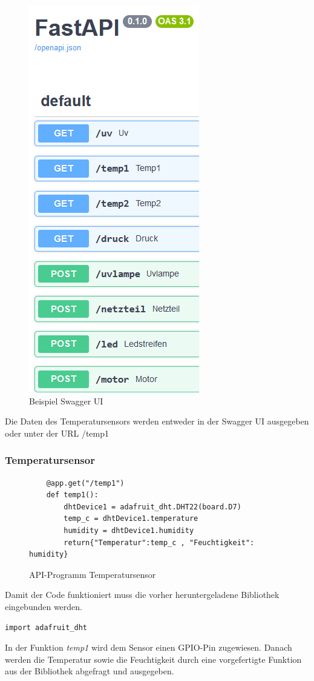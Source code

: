 \begin{figure}[H]
    \centering
    \includegraphics[scale=1.3]{image/fastapi.png}
    \caption{Beispiel Swagger UI}
    \label{fig:enter-label}
\end{figure}
\vspace{3mm}
Die Daten des Temperatursensors werden entweder in der Swagger UI ausgegeben oder unter der URL /temp1
\pagebreak
\subsubsection{Temperatursensor}\label{sec:API-Temp}
\begin{figure}[H]
    \centering
    \begin{verbatim}
    @app.get("/temp1")
    def temp1():
        dhtDevice1 = adafruit_dht.DHT22(board.D7)
        temp_c = dhtDevice1.temperature
        humidity = dhtDevice1.humidity
        return{"Temperatur":temp_c , "Feuchtigkeit": humidity}
    \end{verbatim}
    \caption{API-Programm Temperatursensor}
\end{figure}
Damit der Code funktioniert muss die vorher heruntergeladene Bibliothek eingebunden werden. 
\begin{verbatim}
import adafruit_dht
\end{verbatim}
In der Funktion \textit{temp1} wird dem Sensor einen GPIO-Pin zugewiesen. Danach werden die Temperatur sowie die Feuchtigkeit durch eine vorgefertigte Funktion aus der Bibliothek abgefragt und ausgegeben.

